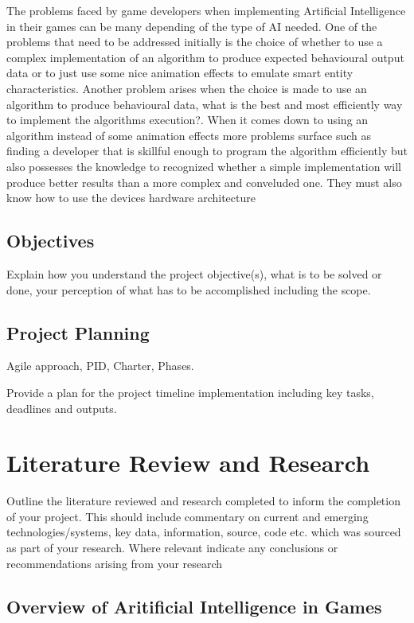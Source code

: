 \documentclass[12pt,a4paper,titlepage]{article}
\begin{document}
The problems faced by game developers when implementing Artificial Intelligence in their games can be many depending of the type of AI needed. One of the problems that need to be addressed initially is the choice of whether to use a complex implementation of an algorithm to produce expected behavioural output data or to just use some nice animation effects to emulate smart entity characteristics. Another problem arises when the choice is made to use an algorithm to produce behavioural data, what is the best and most efficiently way to implement the algorithms execution?. When it comes down to using an algorithm instead of some animation effects more problems surface such as finding a developer that is skillful enough to program the algorithm efficiently but also possesses the knowledge to recognized whether a simple implementation will produce better results than a more complex and conveluded one. They must also know how to use the devices hardware architecture


\subsection{Objectives}
Explain how you understand the project objective(s), what is to be solved or done, your perception of what has to be accomplished including the scope. 

\subsection{Project Planning}
Agile approach, PID, Charter, Phases.

Provide a plan for the project timeline implementation including key tasks, deadlines and outputs.

\section{Literature Review and Research}
Outline the literature reviewed and research completed to inform the completion of your project.  This should include commentary on current and emerging technologies/systems, key data, information, source, code etc. which was sourced as part of your research.  Where relevant indicate any conclusions or recommendations arising from your research

\subsection{Overview of Aritificial Intelligence in Games}
\end{document}
